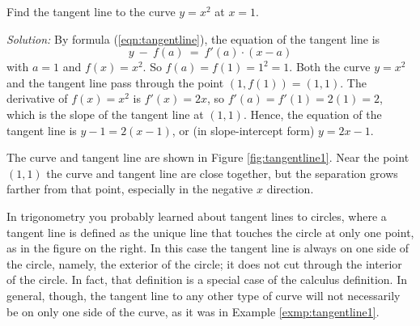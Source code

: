 \begin{exmp}\label{exmp:tangentline1}
 \piccaption[]{\label{fig:tangentline1}}
\noindent Find the tangent line to the curve $y = x^2$ at $x = 1$.\vspace{1mm}
\par\noindent\emph{Solution:} By formula (\ref{eqn:tangentline}), the equation
of the tangent line is
\begin{displaymath}
 y ~-~ f(a) ~=~ f'(a) \cdot (x - a)
\end{displaymath}
with $a = 1$ and $f(x) = x^2$. So $f(a) = f(1) = 1^2 = 1$. Both the curve
$y = x^2$ and the tangent line pass through the point $(1, f(1)) = (1,1)$. The
derivative of $f(x) = x^2$ is $f'(x) = 2x$, so $f'(a) = f'(1) = 2(1) = 2$, which
is the slope of the tangent line at $(1,1)$. Hence, the equation of the tangent
line is $y - 1 = 2(x - 1)$, or (in
slope-intercept form) $y = 2x - 1$.\vspace{2mm}
\par\noindent The curve and tangent line are shown in
Figure \ref{fig:tangentline1}. Near the point $(1,1)$ the curve and tangent line
are close together, but the separation grows farther from that point, especially
in the negative $x$ direction.
\end{exmp}
\divider
\vspace{3mm}

In trigonometry you probably learned about tangent lines to circles, where a
tangent line is defined as the unique line that touches the circle at only one
point, as in the figure on the right. In this case the tangent line is always on
one side of the circle, namely, the exterior of the circle; it does not cut
through the interior of the circle. In fact, that definition is a special case
of the calculus definition. In general, though, the tangent line to any other
type of curve will not necessarily be on only one side of the curve, as it was
in Example \ref{exmp:tangentline1}.

